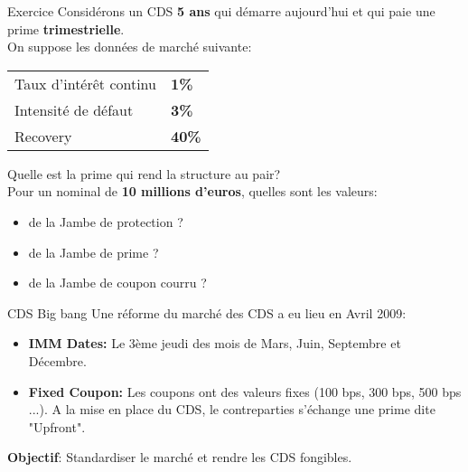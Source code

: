 \documentclass{beamer}
\begin{document}
\begin{frame}{Exercice}
Considérons un CDS \textbf{5 ans} qui démarre aujourd'hui et qui paie une prime \textbf{trimestrielle}.\\
\vspace{0.5cm}
On suppose les données de marché suivante:\\
\begin{center}
\begin{tabular}{|l|l|}
\hline
Taux d'intérêt continu&\textbf{1\%}\\
Intensité de défaut&\textbf{3\%}\\
Recovery&\textbf{40\%}\\
\hline
\end{tabular}
\end{center}
Quelle est la prime qui rend la structure au pair?\\
Pour un nominal de \textbf{10 millions d'euros}, quelles sont les valeurs:\\
\begin{itemize}
\item de la Jambe de protection ?\\
\item de la Jambe de prime ? \\
\item de la Jambe de coupon courru ?\\
\end{itemize}
\end{frame}

\begin{frame}{CDS Big bang}
Une réforme du marché des CDS a eu lieu en Avril 2009:\\
\vspace{0.5cm}
\begin{itemize}
\item \textbf{IMM Dates:} Le 3ème jeudi des mois de Mars, Juin, Septembre et Décembre.
\item \textbf{Fixed Coupon:} Les coupons ont des valeurs fixes (100 bps, 300 bps, 500 bps ...). A la mise en place du CDS, le contreparties s'échange une prime dite "Upfront".
\end{itemize}
\vspace{0.5cm}
\textbf{Objectif}: Standardiser le marché et rendre les CDS fongibles.
\end{frame}
\end{document}
